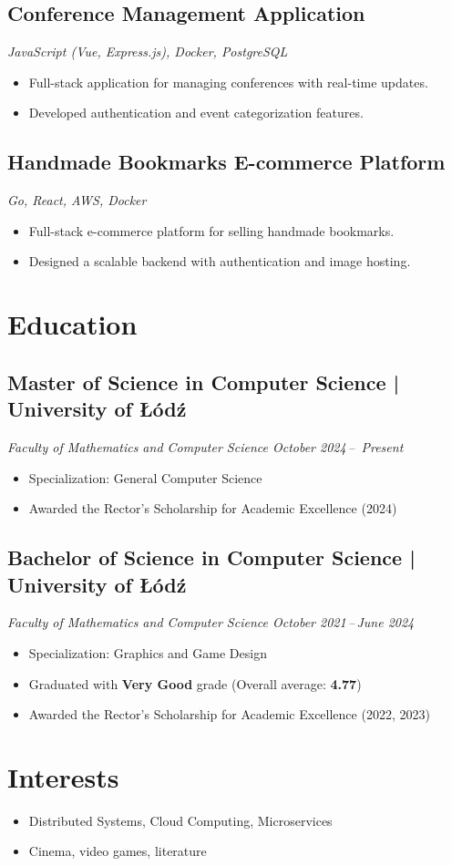 \documentclass[a4paper,10pt]{article}
\begin{document}
\subsection{Conference Management Application}
\textit{JavaScript (Vue, Express.js), Docker, PostgreSQL}
\begin{itemize}[leftmargin=0.5cm, nosep]
    \item Full-stack application for managing conferences with real-time updates.
    \item Developed authentication and event categorization features.
\end{itemize}

\subsection{Handmade Bookmarks E-commerce Platform}
\textit{Go, React, AWS, Docker}
\begin{itemize}[leftmargin=0.5cm, nosep]
    \item Full-stack e-commerce platform for selling handmade bookmarks.
    \item Designed a scalable backend with authentication and image hosting.
\end{itemize}

\section{Education}

\subsection{Master of Science in Computer Science | University of Łódź}
\textit{Faculty of Mathematics and Computer Science \hfill October 2024\,--\, Present}
\begin{itemize}[leftmargin=0.5cm, nosep]
  \item Specialization: General Computer Science
  \item Awarded the Rector's Scholarship for Academic Excellence (2024)
\end{itemize}

\subsection{Bachelor of Science in Computer Science | University of Łódź}
\textit{Faculty of Mathematics and Computer Science \hfill October 2021\,--\,June 2024}
\begin{itemize}[leftmargin=0.5cm, nosep]
  \item Specialization: Graphics and Game Design
  \item Graduated with \textbf{Very Good} grade (Overall average: \textbf{4.77})
  \item Awarded the Rector's Scholarship for Academic Excellence (2022, 2023)
\end{itemize}

\section{Interests}
\begin{itemize}[leftmargin=0.5cm, nosep]
    \item Distributed Systems, Cloud Computing, Microservices
    \item Cinema, video games, literature
\end{itemize}
\end{document}
